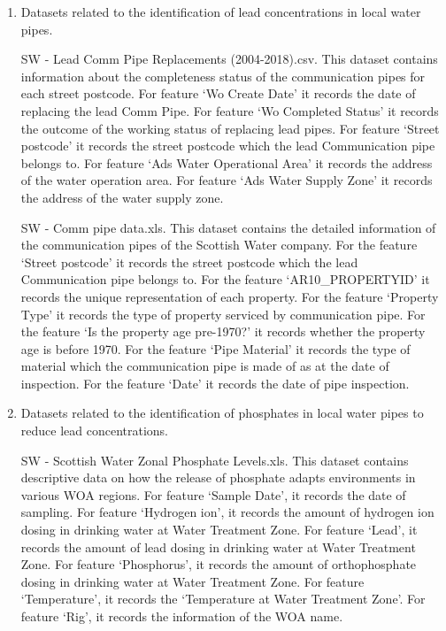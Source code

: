 \documentclass[11pt,twoside]{article}
\numberwithin{Theorem}{section}
\numberwithin{Definition}{section}
\numberwithin{Lemma}{section}
\numberwithin{Algorithm}{section}
\numberwithin{equation}{section}
\begin{document}
\begin{enumerate}

\item Datasets related to the identification of lead concentrations in local water pipes.

SW - Lead Comm Pipe Replacements (2004-2018).csv. This dataset contains information about the completeness status of the communication pipes for each street postcode. For feature ‘Wo Create Date’ it records the date of replacing the lead Comm Pipe. For feature ‘Wo Completed Status’ it records the outcome of the working status of replacing lead pipes. For feature ‘Street postcode’ it records the street postcode which the lead Communication pipe belongs to. For feature ‘Ads Water Operational Area’ it records the address of the water operation area. For feature ‘Ads Water Supply Zone’ it records the address of the water supply zone.

SW - Comm pipe data.xls. This dataset contains the detailed information of the communication pipes of the Scottish Water company. For the feature ‘Street postcode’ it records the street postcode which the lead Communication pipe belongs to. For the feature ‘AR10\_PROPERTYID’ it records the unique representation of each property. For the feature ‘Property Type’ it records the type of property serviced by communication pipe. For the feature ‘Is the property age pre-1970?’ it records whether the property age is before 1970. For the feature ‘Pipe Material’ it records the type of material which the communication pipe is made of as at the date of inspection. For the feature ‘Date’ it records the date of pipe inspection.

\item Datasets related to the identification of phosphates in local water pipes to reduce lead concentrations.

SW - Scottish Water Zonal Phosphate Levels.xls. This dataset contains descriptive data on how the release of phosphate adapts environments in various WOA regions. For feature ‘Sample Date’, it records the date of sampling. For feature ‘Hydrogen ion’, it records the amount of hydrogen ion dosing in drinking water at Water Treatment Zone. For feature ‘Lead’, it records the amount of lead dosing in drinking water at Water Treatment Zone. For feature ‘Phosphorus’, it records the amount of orthophosphate dosing in drinking water at Water Treatment Zone. For feature ‘Temperature’, it records the ‘Temperature at Water Treatment Zone’. For feature ‘Rig’, it records the information of the WOA name.


\end{enumerate}
\end{document}

